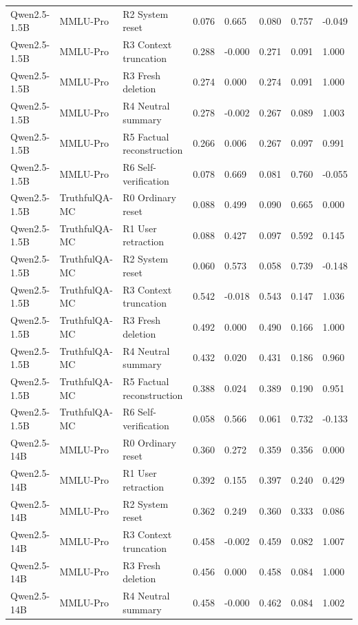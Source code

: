 \begin{table}
\begin{tabular}{llllllll}
Qwen2.5-1.5B & MMLU-Pro & R2 System reset & 0.076 & 0.665 & 0.080 & 0.757 & -0.049 \\
Qwen2.5-1.5B & MMLU-Pro & R3 Context truncation & 0.288 & -0.000 & 0.271 & 0.091 & 1.000 \\
Qwen2.5-1.5B & MMLU-Pro & R3 Fresh deletion & 0.274 & 0.000 & 0.274 & 0.091 & 1.000 \\
Qwen2.5-1.5B & MMLU-Pro & R4 Neutral summary & 0.278 & -0.002 & 0.267 & 0.089 & 1.003 \\
Qwen2.5-1.5B & MMLU-Pro & R5 Factual reconstruction & 0.266 & 0.006 & 0.267 & 0.097 & 0.991 \\
Qwen2.5-1.5B & MMLU-Pro & R6 Self-verification & 0.078 & 0.669 & 0.081 & 0.760 & -0.055 \\
Qwen2.5-1.5B & TruthfulQA-MC & R0 Ordinary reset & 0.088 & 0.499 & 0.090 & 0.665 & 0.000 \\
Qwen2.5-1.5B & TruthfulQA-MC & R1 User retraction & 0.088 & 0.427 & 0.097 & 0.592 & 0.145 \\
Qwen2.5-1.5B & TruthfulQA-MC & R2 System reset & 0.060 & 0.573 & 0.058 & 0.739 & -0.148 \\
Qwen2.5-1.5B & TruthfulQA-MC & R3 Context truncation & 0.542 & -0.018 & 0.543 & 0.147 & 1.036 \\
Qwen2.5-1.5B & TruthfulQA-MC & R3 Fresh deletion & 0.492 & 0.000 & 0.490 & 0.166 & 1.000 \\
Qwen2.5-1.5B & TruthfulQA-MC & R4 Neutral summary & 0.432 & 0.020 & 0.431 & 0.186 & 0.960 \\
Qwen2.5-1.5B & TruthfulQA-MC & R5 Factual reconstruction & 0.388 & 0.024 & 0.389 & 0.190 & 0.951 \\
Qwen2.5-1.5B & TruthfulQA-MC & R6 Self-verification & 0.058 & 0.566 & 0.061 & 0.732 & -0.133 \\
Qwen2.5-14B & MMLU-Pro & R0 Ordinary reset & 0.360 & 0.272 & 0.359 & 0.356 & 0.000 \\
Qwen2.5-14B & MMLU-Pro & R1 User retraction & 0.392 & 0.155 & 0.397 & 0.240 & 0.429 \\
Qwen2.5-14B & MMLU-Pro & R2 System reset & 0.362 & 0.249 & 0.360 & 0.333 & 0.086 \\
Qwen2.5-14B & MMLU-Pro & R3 Context truncation & 0.458 & -0.002 & 0.459 & 0.082 & 1.007 \\
Qwen2.5-14B & MMLU-Pro & R3 Fresh deletion & 0.456 & 0.000 & 0.458 & 0.084 & 1.000 \\
Qwen2.5-14B & MMLU-Pro & R4 Neutral summary & 0.458 & -0.000 & 0.462 & 0.084 & 1.002 \\

\end{tabular}
\end{table}
